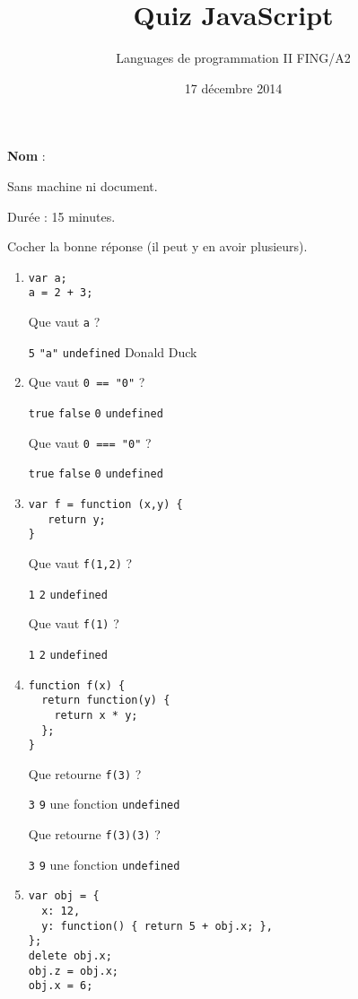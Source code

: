 \documentclass[a4paper, 12pt]{article}
\title{Quiz JavaScript}
\author{Languages de programmation II FING/A2}
\date{17 décembre 2014}
\newcommand{\choice}[1]{\Square\hspace{2pt} #1\hspace{5pt}}
\newcommand{\choicec}[1]{\Square\hspace{2pt} \lstinline{#1}\hspace{5pt}}
\begin{document}
\maketitle

\textbf{Nom} :

Sans machine ni document.

Durée : 15 minutes.

Cocher la bonne réponse (il peut y en avoir plusieurs).

\begin{enumerate}
\item \lstset{language=javascript}
\begin{lstlisting}
var a;
a = 2 + 3;
\end{lstlisting}

  Que vaut \lstinline{a} ?

  \choicec{5} \choicec{"a"} \choicec{undefined} \choice{Donald Duck}
\item \lstset{language=javascript}
  Que vaut \lstinline{0 == "0"} ?

  \choicec{true} \choicec{false} \choicec{0} \choicec{undefined}

  Que vaut \lstinline{0 === "0"} ?

  \choicec{true} \choicec{false} \choicec{0} \choicec{undefined}
\item \lstset{language=javascript}
\begin{lstlisting}
var f = function (x,y) {
   return y;
}
\end{lstlisting}

   Que vaut \lstinline{f(1,2)} ?

   \choicec{1} \choicec{2} \choicec{undefined}

   Que vaut \lstinline{f(1)} ?

   \choicec{1} \choicec{2} \choicec{undefined}
\item \lstset{language=javascript}
\begin{lstlisting}
function f(x) {
  return function(y) {
    return x * y;
  };
}
\end{lstlisting}

  Que retourne \lstinline{f(3)} ?

  \choicec{3} \choicec{9} \choice{une fonction} \choicec{undefined}

  Que retourne \lstinline{f(3)(3)} ?

  \choicec{3} \choicec{9} \choice{une fonction} \choicec{undefined}
\item \lstset{language=javascript}
\begin{lstlisting}
var obj = {
  x: 12,
  y: function() { return 5 + obj.x; },
};
delete obj.x;
obj.z = obj.x;
obj.x = 6;
\end{lstlisting}


\end{enumerate}
\end{document}
